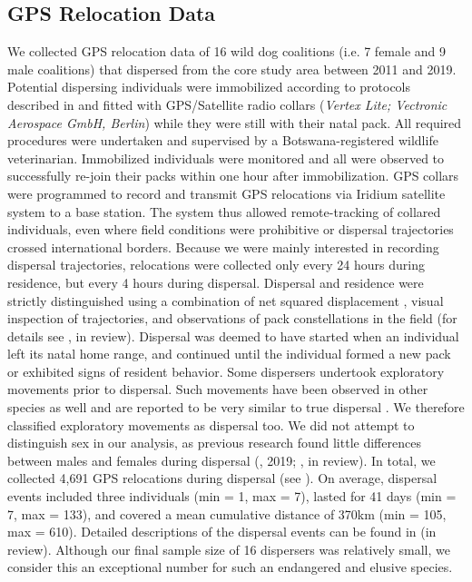 \documentclass[abstract=on,10pt,a4paper,bibliography=totocnumbered]{scrartcl}
\begin{document}
\subsection{GPS Relocation Data}
We collected GPS relocation data of 16 wild dog coalitions (i.e. 7 female and 9
male coalitions) that dispersed from the core study area between 2011 and 2019.
Potential dispersing individuals were immobilized according to protocols
described in \cite{Osofsky.1996} and fitted with GPS/Satellite radio collars
(\textit{Vertex Lite; Vectronic Aerospace GmbH, Berlin}) while they were still
with their natal pack. All required procedures were undertaken and supervised by
a Botswana-registered wildlife veterinarian. Immobilized individuals were
monitored and all were observed to successfully re-join their packs within one
hour after immobilization. GPS collars were programmed to record and transmit
GPS relocations via Iridium satellite system to a base station. The system thus
allowed remote-tracking of collared individuals, even where field conditions
were prohibitive or dispersal trajectories crossed international borders.
Because we were mainly interested in recording dispersal trajectories,
relocations were collected only every 24 hours during residence, but every 4
hours during dispersal. Dispersal and residence were strictly distinguished
using a combination of net squared displacement \citep{Borger.2012}, visual
inspection of trajectories, and observations of pack constellations in the field
(for details see \citeauthor{Cozzi.2019}, in review). Dispersal was deemed to
have started when an individual left its natal home range, and continued until
the individual formed a new pack or exhibited signs of resident behavior. Some
dispersers undertook exploratory movements prior to dispersal. Such movements
have been observed in other species as well and are reported to be very similar
to true dispersal \citep{Killeen.2014}. We therefore classified exploratory
movements as dispersal too. We did not attempt to distinguish sex in our
analysis, as previous research found little differences between males and
females during dispersal (\citeauthor{Woodroffe.2019}, 2019;
\citeauthor{Cozzi.2019}, in review). In total, we collected 4,691 GPS
relocations during dispersal (see ). On average, dispersal
events included three individuals (min = 1, max = 7), lasted for 41 days (min =
7, max = 133), and covered a mean cumulative distance of 370km (min = 105, max =
610). Detailed descriptions of the dispersal events can be found in
\citeauthor{Cozzi.2019} (in review). Although our final sample size of 16
dispersers was relatively small, we consider this an exceptional number for such
an endangered and elusive species.
\end{document}

